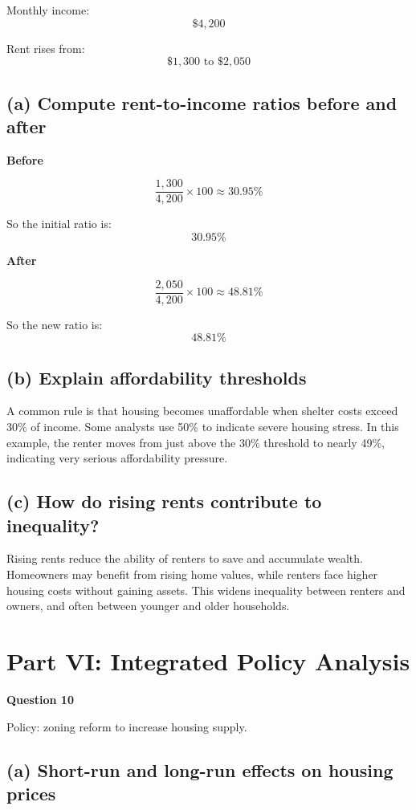 \documentclass[12pt]{article}
\begin{document}
Monthly income:
\[
\$4{,}200
\]

Rent rises from:
\[
\$1{,}300 \text{ to } \$2{,}050
\]

\subsection*{(a) Compute rent-to-income ratios before and after}

\textbf{Before}

\[
\frac{1{,}300}{4{,}200} \times 100 \approx 30.95\%
\]

So the initial ratio is:
\[
\boxed{30.95\%}
\]

\textbf{After}

\[
\frac{2{,}050}{4{,}200} \times 100 \approx 48.81\%
\]

So the new ratio is:
\[
\boxed{48.81\%}
\]

\subsection*{(b) Explain affordability thresholds}

A common rule is that housing becomes unaffordable when shelter costs exceed 30\% of income. Some analysts use 50\% to indicate severe housing stress. In this example, the renter moves from just above the 30\% threshold to nearly 49\%, indicating very serious affordability pressure.

\subsection*{(c) How do rising rents contribute to inequality?}

Rising rents reduce the ability of renters to save and accumulate wealth. Homeowners may benefit from rising home values, while renters face higher housing costs without gaining assets. This widens inequality between renters and owners, and often between younger and older households.

\section*{Part VI: Integrated Policy Analysis}

\textbf{Question 10}

Policy: zoning reform to increase housing supply.

\subsection*{(a) Short-run and long-run effects on housing prices}
\end{document}
